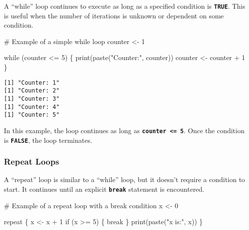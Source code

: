 \documentclass[
  letterpaper,
  DIV=11,
  numbers=noendperiod]{scrartcl}
\newenvironment{Shaded}{\begin{snugshade}}{\end{snugshade}}
\newcommand{\CommentTok}[1]{\textcolor[rgb]{0.37,0.37,0.37}{#1}}
\newcommand{\ControlFlowTok}[1]{\textcolor[rgb]{0.00,0.23,0.31}{#1}}
\newcommand{\DecValTok}[1]{\textcolor[rgb]{0.68,0.00,0.00}{#1}}
\newcommand{\FunctionTok}[1]{\textcolor[rgb]{0.28,0.35,0.67}{#1}}
\newcommand{\NormalTok}[1]{\textcolor[rgb]{0.00,0.23,0.31}{#1}}
\newcommand{\OtherTok}[1]{\textcolor[rgb]{0.00,0.23,0.31}{#1}}
\newcommand{\SpecialCharTok}[1]{\textcolor[rgb]{0.37,0.37,0.37}{#1}}
\newcommand{\StringTok}[1]{\textcolor[rgb]{0.13,0.47,0.30}{#1}}
\begin{document}
A ``while'' loop continues to execute as long as a specified condition
is \textbf{\texttt{TRUE}}. This is useful when the number of iterations
is unknown or dependent on some condition.

\begin{Shaded}
\begin{Highlighting}[]
\CommentTok{\# Example of a simple while loop}
\NormalTok{counter }\OtherTok{\textless{}{-}} \DecValTok{1}

\ControlFlowTok{while}\NormalTok{ (counter }\SpecialCharTok{\textless{}=} \DecValTok{5}\NormalTok{) \{}
  \FunctionTok{print}\NormalTok{(}\FunctionTok{paste}\NormalTok{(}\StringTok{"Counter:"}\NormalTok{, counter))}
\NormalTok{  counter }\OtherTok{\textless{}{-}}\NormalTok{ counter }\SpecialCharTok{+} \DecValTok{1}
\NormalTok{\}}
\end{Highlighting}
\end{Shaded}

\begin{verbatim}
[1] "Counter: 1"
[1] "Counter: 2"
[1] "Counter: 3"
[1] "Counter: 4"
[1] "Counter: 5"
\end{verbatim}

In this example, the loop continues as long as
\textbf{\texttt{counter\ \textless{}=\ 5}}. Once the condition is
\textbf{\texttt{FALSE}}, the loop terminates.

\hypertarget{repeat-loops}{%
\subsubsection{Repeat Loops}\label{repeat-loops}}

A ``repeat'' loop is similar to a ``while'' loop, but it doesn't require
a condition to start. It continues until an explicit
\textbf{\texttt{break}} statement is encountered.

\begin{Shaded}
\begin{Highlighting}[]
\CommentTok{\# Example of a repeat loop with a break condition}
\NormalTok{x }\OtherTok{\textless{}{-}} \DecValTok{0}

\ControlFlowTok{repeat}\NormalTok{ \{}
\NormalTok{  x }\OtherTok{\textless{}{-}}\NormalTok{ x }\SpecialCharTok{+} \DecValTok{1}
  \ControlFlowTok{if}\NormalTok{ (x }\SpecialCharTok{\textgreater{}=} \DecValTok{5}\NormalTok{) \{}
    \ControlFlowTok{break}
\NormalTok{  \}}
  \FunctionTok{print}\NormalTok{(}\FunctionTok{paste}\NormalTok{(}\StringTok{"x is:"}\NormalTok{, x))}
\NormalTok{\}}
\end{Highlighting}
\end{Shaded}
\end{document}
